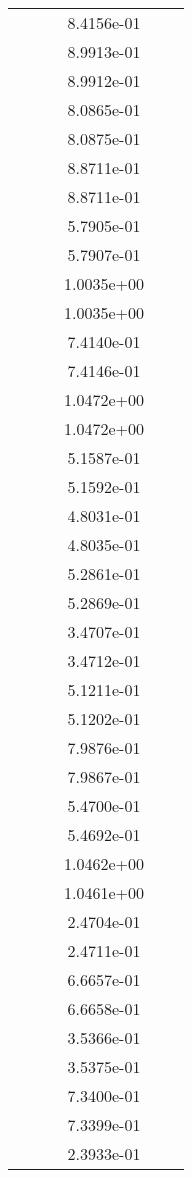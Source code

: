 \begin{xltabular}{\textwidth}{r|rS[table-format=1.3e+2]S[table-format=1.4e+2]S[table-format=1.4e+2]S[table-format=-1.5]}
&  &  & 8.4156e-01 & & \\
&  &  & 8.9913e-01 & & \\
&  &  & 8.9912e-01 & & \\
&  &  & 8.0865e-01 & & \\
&  &  & 8.0875e-01 & & \\
&  &  & 8.8711e-01 & & \\
&  &  & 8.8711e-01 & & \\
&  &  & 5.7905e-01 & & \\
&  &  & 5.7907e-01 & & \\
&  &  & 1.0035e+00 & & \\
&  &  & 1.0035e+00 & & \\
&  &  & 7.4140e-01 & & \\
&  &  & 7.4146e-01 & & \\
&  &  & 1.0472e+00 & & \\
&  &  & 1.0472e+00 & & \\
&  &  & 5.1587e-01 & & \\
&  &  & 5.1592e-01 & & \\
&  &  & 4.8031e-01 & & \\
&  &  & 4.8035e-01 & & \\
&  &  & 5.2861e-01 & & \\
&  &  & 5.2869e-01 & & \\
&  &  & 3.4707e-01 & & \\
&  &  & 3.4712e-01 & & \\
&  &  & 5.1211e-01 & & \\
&  &  & 5.1202e-01 & & \\
&  &  & 7.9876e-01 & & \\
&  &  & 7.9867e-01 & & \\
&  &  & 5.4700e-01 & & \\
&  &  & 5.4692e-01 & & \\
&  &  & 1.0462e+00 & & \\
&  &  & 1.0461e+00 & & \\
&  &  & 2.4704e-01 & & \\
&  &  & 2.4711e-01 & & \\
&  &  & 6.6657e-01 & & \\
&  &  & 6.6658e-01 & & \\
&  &  & 3.5366e-01 & & \\
&  &  & 3.5375e-01 & & \\
&  &  & 7.3400e-01 & & \\
&  &  & 7.3399e-01 & & \\
&  &  & 2.3933e-01 & & \\

\end{xltabular}
